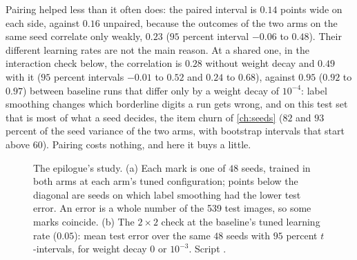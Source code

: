 \begin{refsection}
Pairing helped less than it often does: the paired interval is $0.14$ points wide on each side, against $0.16$ unpaired, because the outcomes of the two arms on the same seed correlate only weakly, $0.23$ ($95$ percent interval $-0.06$ to $0.48$). Their different learning rates are not the main reason. At a shared one, in the interaction check below, the correlation is $0.28$ without weight decay and $0.49$ with it ($95$ percent intervals $-0.01$ to $0.52$ and $0.24$ to $0.68$), against $0.95$ ($0.92$ to $0.97$) between baseline runs that differ only by a weight decay of $10^{-4}$: label smoothing changes which borderline digits a run gets wrong, and on this test set that is most of what a seed decides, the item churn of \cref{ch:seeds} ($82$ and $93$ percent of the seed variance of the two arms, with bootstrap intervals that start above $60$). Pairing costs nothing, and here it buys a little.

\begin{figure}[t]
\begin{fullwidth}
\centering
{}
\end{fullwidth}
\caption{The epilogue's study. (a) Each mark is one of $48$ seeds, trained in both arms at each arm's tuned configuration; points below the diagonal are seeds on which label smoothing had the lower test error. An error is a whole number of the 539 test images, so some marks coincide. (b) The $2\times2$ check at the baseline's tuned learning rate ($0.05$): mean test error over the same $48$ seeds with $95$ percent $t$-intervals, for weight decay $0$ or $10^{-3}$. Script .}\label{fig:epilogue:result}
\end{figure}


\end{refsection}
